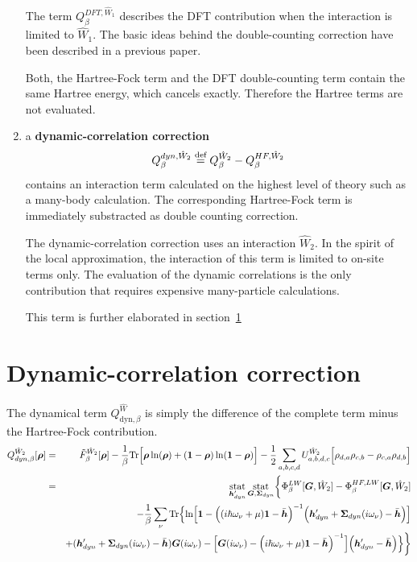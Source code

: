 \documentclass[11pt,a4paper]{report}
\begin{document}
\begin{enumerate}
  The term $Q^{DFT,\hat{W}_1}_\beta$ describes the DFT contribution
  when the interaction is limited to $\hat{W}_1$. The basic ideas
  behind the double-counting correction have been described in a
  previous paper\cite{bloechl11_prb84_205101}.

  Both, the Hartree-Fock term and the DFT double-counting term contain
  the same Hartree energy, which cancels exactly. Therefore the
  Hartree terms are not evaluated.
%
\item a \textbf{dynamic-correlation
  correction}
  \begin{eqnarray}
  Q^{dyn,\hat{W}_2}_\beta\stackrel{\text{def}}{=} Q^{\hat{W}_2}_\beta-Q^{HF,\hat{W}_2}_\beta
  \end{eqnarray}
  contains an interaction term calculated on the highest level of
  theory such as a many-body calculation. The corresponding
  Hartree-Fock term is immediately substracted as double counting
  correction.

  The dynamic-correlation correction uses an interaction
  $\hat{W}_2$. In the spirit of the local approximation, the
  interaction of this term is limited to on-site terms only. The
  evaluation of the dynamic correlations is the only contribution that
  requires expensive many-particle calculations.

  This term is further elaborated in section~\ref{sec:dyncorelcorr}
\end{enumerate}

\section{Dynamic-correlation correction}
\label{sec:dyncorelcorr}
The dynamical term
$Q_{\text{dyn},\beta}^{\hat{W}}$
is simply the difference of the complete term minus the Hartree-Fock
contribution.
\begin{eqnarray}
Q^{\hat{W}_2}_{dyn,\beta}[\bm{\rho}]
&=&\tilde{F}^{\hat{W}_2}_\beta[\bm{\rho}]
-
\frac{1}{\beta}\mathrm{Tr}\Bigl[
\bm{\rho}\ln(\bm{\rho})+(\bm{1}-\bm{\rho})\ln(\bm{1}-\bm{\rho})\Bigr]
-
\frac{1}{2}\sum_{a,b,c,d}U^{\hat{W}_2}_{a,b,d,c}
\Bigl[\rho_{d,a}\rho_{c,b}-\rho_{c,a}\rho_{d,b}\Bigr]
\nonumber\\
&=&
\operatorname*{stat}_{\bm{h}'_{dyn}}\operatorname*{stat}_{\bm{G},\bm{\Sigma}_{dyn}}
\biggl\lbrace
\Phi^{LW}_\beta[\bm{G},\hat{W}_2]-\Phi^{HF,LW}_\beta[\bm{G},\hat{W}_2]
\nonumber\\
&&-\frac{1}{\beta}\sum_\nu\mathrm{Tr}\Bigl\lbrace
\ln\Bigl[
\bm{1}-
\Bigl((i\hbar\omega_\nu+\mu)\bm{1}-\bar{\bm{h}}\Bigr)^{-1}
\Bigl(\bm{h}'_{dyn}+\bm{\Sigma}_{dyn}(i\omega_\nu)-\bar{\bm{h}}\Bigr)
\Bigr]
\nonumber\\&&
+(\bm{h}'_{dyn}+\bm{\Sigma}_{dyn}(i\omega_\nu)-\bar{\bm{h}})\bm{G}(i\omega_\nu)
-
\Bigl[
\bm{G}(i\omega_\nu)
-\Bigl(i\hbar\omega_\nu+\mu)\bm{1}-\bar{\bm{h}}\Bigr)^{-1}
\Bigr]
\Bigl(\bm{h}'_{dyn}-\bar{\bm{h}}\Bigr)\Bigr\rbrace
\biggr\rbrace
\nonumber\\
\label{eq:dmf1greena}
\end{eqnarray}
\end{document}
